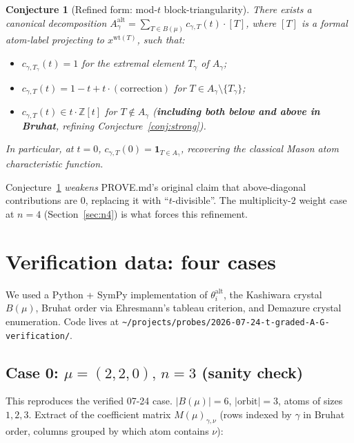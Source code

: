 \documentclass[11pt]{article}
\newtheorem{conjecture}[theorem]{Conjecture}
\theoremstyle{definition}
\theoremstyle{remark}
\newcommand{\Aalt}{A^{\mathrm{alt}}}
\newcommand{\thetaalt}{\theta^{\mathrm{alt}}}
\newcommand{\wt}{\mathrm{wt}}
\newcommand{\ZZ}{\mathbb{Z}}
\begin{document}
\begin{conjecture}[Refined form: mod-$t$ block-triangularity]
\label{conj:refined}
There exists a canonical decomposition
$\Aalt_\gamma = \sum_{T \in B(\mu)} c_{\gamma, T}(t) \cdot [T]$,
where $[T]$ is a formal atom-label projecting to $x^{\wt(T)}$, such that:
\begin{itemize}
   \item $c_{\gamma, T_\gamma}(t) = 1$ for the extremal element $T_\gamma$ of $A_\gamma$;
   \item $c_{\gamma, T}(t) = 1 - t + t \cdot (\text{correction})$ for $T \in A_\gamma \setminus \{T_\gamma\}$;
   \item $c_{\gamma, T}(t) \in t \cdot \ZZ[t]$ for $T \notin A_\gamma$
         (\textbf{including both below and above in Bruhat}, refining Conjecture~\ref{conj:strong}).
\end{itemize}
In particular, at $t = 0$, $c_{\gamma, T}(0) = \mathbf{1}_{T \in A_\gamma}$,
recovering the classical Mason atom characteristic function.
\end{conjecture}

Conjecture~\ref{conj:refined} \emph{weakens} PROVE.md's original claim
that above-diagonal contributions are $0$, replacing it with
``$t$-divisible''. The multiplicity-$2$ weight case at $n=4$
(Section~\ref{sec:n4}) is what forces this refinement.

\section{Verification data: four cases}

We used a Python + SymPy implementation of $\thetaalt_i$, the Kashiwara
crystal $B(\mu)$, Bruhat order via Ehresmann's tableau criterion, and
Demazure crystal enumeration. Code lives at
\texttt{\textasciitilde/projects/probes/2026-07-24-t-graded-A-G-verification/}.

\subsection{Case 0: $\mu = (2,2,0),\, n = 3$ (sanity check)}

This reproduces the verified 07-24 case. $|B(\mu)| = 6$, $|\text{orbit}| = 3$,
atoms of sizes $1, 2, 3$. Extract of the coefficient matrix
$M(\mu)_{\gamma, \nu}$ (rows indexed by $\gamma$ in Bruhat order,
columns grouped by which atom contains $\nu$):

\medskip
\end{document}
